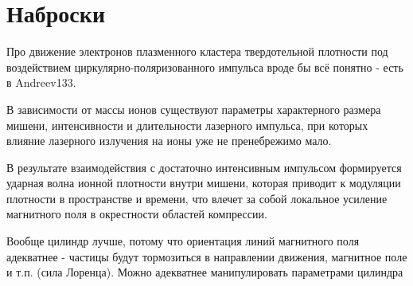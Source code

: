 \section{Наброски}

Про движение электронов плазменного кластера твердотельной плотности под воздействием циркулярно-поляризованного импульса вроде бы всё понятно - есть в Andreev133.

В зависимости от массы ионов существуют параметры характерного размера мишени, интенсивности и длительности лазерного импульса, при которых влияние лазерного излучения на ионы уже не пренебрежимо мало. 

В результате взаимодействия с достаточно интенсивным импульсом формируется ударная волна ионной плотности внутри мишени, которая приводит к модуляции плотности в пространстве и времени, что влечет за собой локальное усиление магнитного поля в окрестности областей компрессии.

Вообще цилиндр лучше, потому что ориентация линий магнитного поля адекватнее - частицы будут тормозиться в направлении движения, магнитное поле и т.п. (сила Лоренца). Можно адекватнее манипулировать параметрами цилиндра